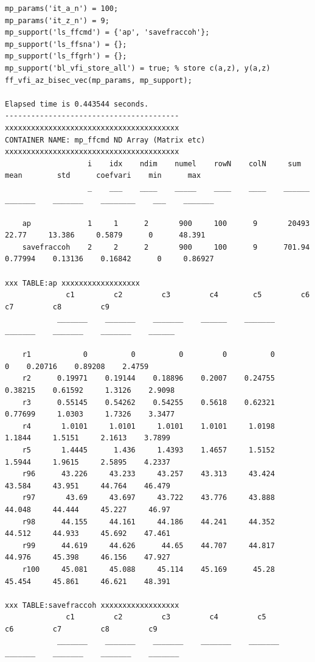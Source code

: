 \documentclass[
]{book}
\begin{document}
\begin{verbatim}
mp_params('it_a_n') = 100;
mp_params('it_z_n') = 9;
mp_support('ls_ffcmd') = {'ap', 'savefraccoh'};
mp_support('ls_ffsna') = {};
mp_support('ls_ffgrh') = {};
mp_support('bl_vfi_store_all') = true; % store c(a,z), y(a,z)
ff_vfi_az_bisec_vec(mp_params, mp_support);

Elapsed time is 0.443544 seconds.
----------------------------------------
xxxxxxxxxxxxxxxxxxxxxxxxxxxxxxxxxxxxxxxx
CONTAINER NAME: mp_ffcmd ND Array (Matrix etc)
xxxxxxxxxxxxxxxxxxxxxxxxxxxxxxxxxxxxxxxx
                   i    idx    ndim    numel    rowN    colN     sum       mean        std      coefvari    min      max  
                   _    ___    ____    _____    ____    ____    ______    _______    _______    ________    ___    _______

    ap             1     1      2       900     100      9       20493      22.77     13.386     0.5879      0      48.391
    savefraccoh    2     2      2       900     100      9      701.94    0.77994    0.13136    0.16842      0     0.86927

xxx TABLE:ap xxxxxxxxxxxxxxxxxx
              c1         c2         c3         c4        c5         c6         c7         c8         c9  
            _______    _______    _______    ______    _______    _______    _______    _______    ______

    r1            0          0          0         0          0          0    0.20716    0.89208    2.4759
    r2      0.19971    0.19144    0.18896    0.2007    0.24755    0.38215    0.61592     1.3126    2.9098
    r3      0.55145    0.54262    0.54255    0.5618    0.62321    0.77699     1.0303     1.7326    3.3477
    r4       1.0101     1.0101     1.0101    1.0101     1.0198     1.1844     1.5151     2.1613    3.7899
    r5       1.4445      1.436     1.4393    1.4657     1.5152     1.5944     1.9615     2.5895    4.2337
    r96      43.226     43.233     43.257    43.313     43.424     43.584     43.951     44.764    46.479
    r97       43.69     43.697     43.722    43.776     43.888     44.048     44.444     45.227     46.97
    r98      44.155     44.161     44.186    44.241     44.352     44.512     44.933     45.692    47.461
    r99      44.619     44.626      44.65    44.707     44.817     44.976     45.398     46.156    47.927
    r100     45.081     45.088     45.114    45.169      45.28     45.454     45.861     46.621    48.391

xxx TABLE:savefraccoh xxxxxxxxxxxxxxxxxx
              c1         c2         c3         c4         c5         c6         c7         c8         c9   
            _______    _______    _______    _______    _______    _______    _______    _______    _______


\end{verbatim}
\end{document}
